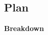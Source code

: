 \documentclass[ %
                    author={Callum Pearce},
                supervisor={Dr. Neill Campbell},
                    degree={MEng},
                     title={How effective are Temporal difference learning methods for reducing the number of zero contribution light paths while still accurately approximating Global Illumination in Path tracing?},
                  subtitle={},
                      type={research},
                      year={2019} ]{dissertation}
\begin{document}

\subsection{Plan}
\textbf{Breakdown}
\end{document}
